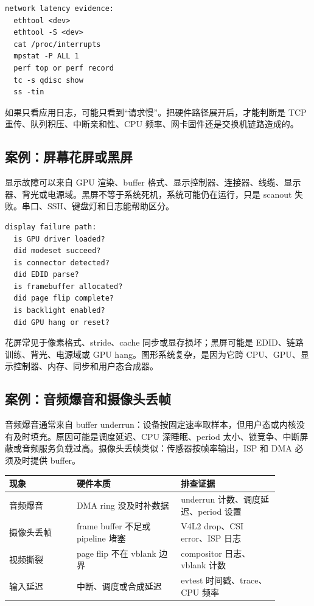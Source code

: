 \begin{lstlisting}
network latency evidence:
  ethtool <dev>
  ethtool -S <dev>
  cat /proc/interrupts
  mpstat -P ALL 1
  perf top or perf record
  tc -s qdisc show
  ss -tin
\end{lstlisting}

如果只看应用日志，可能只看到“请求慢”。把硬件路径展开后，才能判断是 TCP 重传、队列积压、中断亲和性、CPU 频率、网卡固件还是交换机链路造成的。

\subsection{案例：屏幕花屏或黑屏}

显示故障可以来自 GPU 渲染、buffer 格式、显示控制器、连接器、线缆、显示器、背光或电源域。黑屏不等于系统死机，系统可能仍在运行，只是 scanout 失败。串口、SSH、键盘灯和日志能帮助区分。

\begin{lstlisting}
display failure path:
  is GPU driver loaded?
  did modeset succeed?
  is connector detected?
  did EDID parse?
  is framebuffer allocated?
  did page flip complete?
  is backlight enabled?
  did GPU hang or reset?
\end{lstlisting}

花屏常见于像素格式、stride、cache 同步或显存损坏；黑屏可能是 EDID、链路训练、背光、电源域或 GPU hang。图形系统复杂，是因为它跨 CPU、GPU、显示控制器、内存、同步和用户态合成器。

\subsection{案例：音频爆音和摄像头丢帧}

音频爆音通常来自 buffer underrun：设备按固定速率取样本，但用户态或内核没有及时填充。原因可能是调度延迟、CPU 深睡眠、period 太小、锁竞争、中断屏蔽或音频服务负载过高。摄像头丢帧类似：传感器按帧率输出，ISP 和 DMA 必须及时提供 buffer。

\begin{longtable}{p{0.22\linewidth}p{0.34\linewidth}p{0.32\linewidth}}
\toprule
现象 & 硬件本质 & 排查证据 \\
\midrule
音频爆音 & DMA ring 没及时补数据 & underrun 计数、调度延迟、period 设置 \\
摄像头丢帧 & frame buffer 不足或 pipeline 堵塞 & V4L2 drop、CSI error、ISP 日志 \\
视频撕裂 & page flip 不在 vblank 边界 & compositor 日志、vblank 计数 \\
输入延迟 & 中断、调度或合成延迟 & evtest 时间戳、trace、CPU 频率 \\
\bottomrule
\end{longtable}

